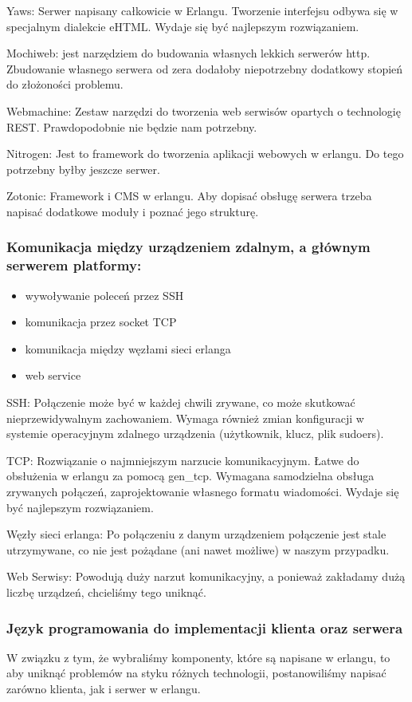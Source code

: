 \documentclass[polish,12pt]{aghthesis}
\begin{document}
Yaws: Serwer napisany całkowicie w Erlangu. Tworzenie interfejsu odbywa się w specjalnym dialekcie eHTML. Wydaje się być najlepszym rozwiązaniem.

Mochiweb: jest narzędziem do budowania własnych lekkich serwerów http. Zbudowanie własnego serwera od zera dodałoby niepotrzebny dodatkowy stopień do złożoności problemu.

Webmachine: Zestaw narzędzi do tworzenia web serwisów opartych o technologię REST. Prawdopodobnie nie będzie nam potrzebny.

Nitrogen: Jest to framework do tworzenia aplikacji webowych w erlangu. Do tego potrzebny byłby jeszcze serwer.

Zotonic: Framework i CMS w erlangu. Aby dopisać obsługę serwera trzeba napisać dodatkowe moduły i poznać jego strukturę.

\subsubsection{Komunikacja między urządzeniem zdalnym, a głównym serwerem platformy:}
\begin{itemize}
\item wywoływanie poleceń przez SSH
\item komunikacja przez socket TCP
\item komunikacja między węzłami sieci erlanga
\item web service
\end{itemize}

SSH: Połączenie może być w każdej chwili zrywane, co może skutkować nieprzewidywalnym zachowaniem. Wymaga również zmian konfiguracji w systemie operacyjnym zdalnego urządzenia (użytkownik, klucz, plik sudoers).

TCP: Rozwiązanie o najmniejszym narzucie komunikacyjnym. Łatwe do obsłużenia w erlangu za pomocą gen\_tcp. Wymagana samodzielna obsługa zrywanych połączeń, zaprojektowanie własnego formatu wiadomości. Wydaje się być najlepszym rozwiązaniem.

Węzły sieci erlanga: Po połączeniu z danym urządzeniem połączenie jest stale utrzymywane, co nie jest pożądane (ani nawet możliwe) w naszym przypadku.

Web Serwisy: Powodują duży narzut komunikacyjny, a ponieważ zakładamy dużą liczbę urządzeń, chcieliśmy tego uniknąć.

\subsubsection{Język programowania do implementacji klienta oraz serwera}
W związku z tym, że wybraliśmy komponenty, które są napisane w erlangu, to aby uniknąć problemów na styku różnych technologii, postanowiliśmy napisać zarówno klienta, jak i serwer w erlangu.
\end{document}
